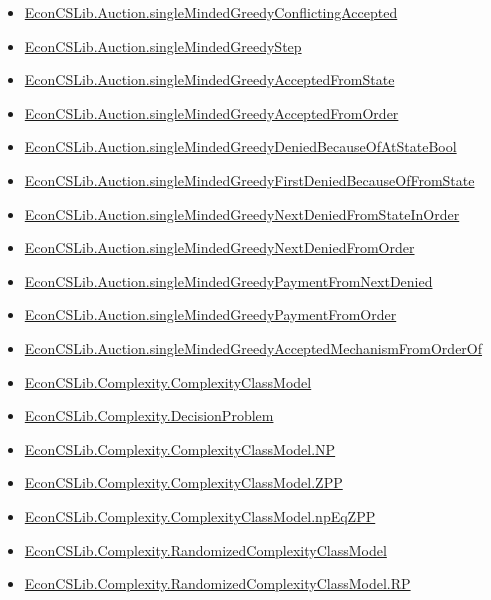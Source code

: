 \documentclass[10pt]{article}
\begin{document}
\begin{itemize}[leftmargin=1.2em]
\begin{itemize}[leftmargin=1.2em]
\item \hyperlink{library-prerequisite-07e47cb38c1ab9ed}{EconCSLib.Auction.singleMindedGreedyConflictingAccepted}
\item \hyperlink{library-prerequisite-0293f871b2d05263}{EconCSLib.Auction.singleMindedGreedyStep}
\item \hyperlink{library-prerequisite-aa8932146b49347b}{EconCSLib.Auction.singleMindedGreedyAcceptedFromState}
\item \hyperlink{library-prerequisite-aca87636d1ee6bee}{EconCSLib.Auction.singleMindedGreedyAcceptedFromOrder}
\item \hyperlink{library-prerequisite-bbeae2f514babc84}{EconCSLib.Auction.singleMindedGreedyDeniedBecauseOfAtStateBool}
\item \hyperlink{library-prerequisite-025c0420679d242f}{EconCSLib.Auction.singleMindedGreedyFirstDeniedBecauseOfFromState}
\item \hyperlink{library-prerequisite-65721fccaead1a9e}{EconCSLib.Auction.singleMindedGreedyNextDeniedFromStateInOrder}
\item \hyperlink{library-prerequisite-d0567dd4de38dad7}{EconCSLib.Auction.singleMindedGreedyNextDeniedFromOrder}
\item \hyperlink{library-prerequisite-a28c4077ffb96817}{EconCSLib.Auction.singleMindedGreedyPaymentFromNextDenied}
\item \hyperlink{library-prerequisite-0c780f947e4b4eec}{EconCSLib.Auction.singleMindedGreedyPaymentFromOrder}
\item \hyperlink{library-prerequisite-460cb00493e39ec9}{EconCSLib.Auction.singleMindedGreedyAcceptedMechanismFromOrderOf}
\item \hyperlink{library-prerequisite-049fdd174b74eaab}{EconCSLib.Complexity.ComplexityClassModel}
\item \hyperlink{library-prerequisite-17007df2c6d19c8b}{EconCSLib.Complexity.DecisionProblem}
\item \hyperlink{library-prerequisite-a78c8c11dec5bf4e}{EconCSLib.Complexity.ComplexityClassModel.NP}
\item \hyperlink{library-prerequisite-e98a420efef5309e}{EconCSLib.Complexity.ComplexityClassModel.ZPP}
\item \hyperlink{library-prerequisite-7fa30735b6842a02}{EconCSLib.Complexity.ComplexityClassModel.npEqZPP}
\item \hyperlink{library-prerequisite-07801ba17bc9ac4c}{EconCSLib.Complexity.RandomizedComplexityClassModel}
\item \hyperlink{library-prerequisite-c05fd9b3c01a8031}{EconCSLib.Complexity.RandomizedComplexityClassModel.RP}

\end{itemize}
\end{itemize}
\end{document}
